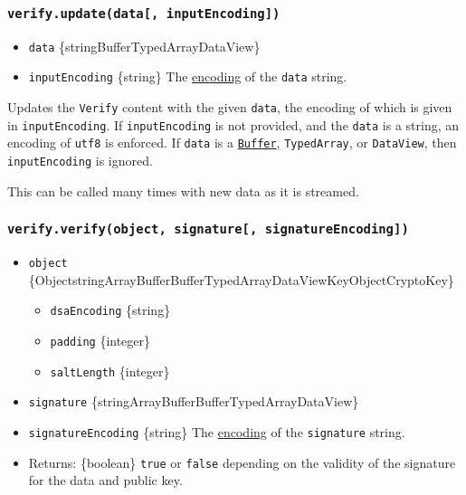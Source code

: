 \subsubsection{\texorpdfstring{\texttt{verify.update(data{[},\ inputEncoding{]})}}{verify.update(data{[}, inputEncoding{]})}}\label{verify.updatedata-inputencoding}

\begin{itemize}
\tightlist
\item
  \texttt{data}
  \{string\textbar Buffer\textbar TypedArray\textbar DataView\}
\item
  \texttt{inputEncoding} \{string\} The
  \href{buffer.md\#buffers-and-character-encodings}{encoding} of the
  \texttt{data} string.
\end{itemize}

Updates the \texttt{Verify} content with the given \texttt{data}, the
encoding of which is given in \texttt{inputEncoding}. If
\texttt{inputEncoding} is not provided, and the \texttt{data} is a
string, an encoding of \texttt{\textquotesingle{}utf8\textquotesingle{}}
is enforced. If \texttt{data} is a \href{buffer.md}{\texttt{Buffer}},
\texttt{TypedArray}, or \texttt{DataView}, then \texttt{inputEncoding}
is ignored.

This can be called many times with new data as it is streamed.

\subsubsection{\texorpdfstring{\texttt{verify.verify(object,\ signature{[},\ signatureEncoding{]})}}{verify.verify(object, signature{[}, signatureEncoding{]})}}\label{verify.verifyobject-signature-signatureencoding}

\begin{itemize}
\tightlist
\item
  \texttt{object}
  \{Object\textbar string\textbar ArrayBuffer\textbar Buffer\textbar TypedArray\textbar DataView\textbar KeyObject\textbar CryptoKey\}

  \begin{itemize}
  \tightlist
  \item
    \texttt{dsaEncoding} \{string\}
  \item
    \texttt{padding} \{integer\}
  \item
    \texttt{saltLength} \{integer\}
  \end{itemize}
\item
  \texttt{signature}
  \{string\textbar ArrayBuffer\textbar Buffer\textbar TypedArray\textbar DataView\}
\item
  \texttt{signatureEncoding} \{string\} The
  \href{buffer.md\#buffers-and-character-encodings}{encoding} of the
  \texttt{signature} string.
\item
  Returns: \{boolean\} \texttt{true} or \texttt{false} depending on the
  validity of the signature for the data and public key.
\end{itemize}

